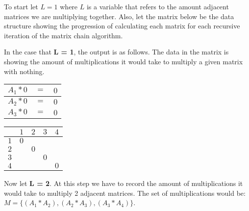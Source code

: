 \documentclass{article}
\begin{document}
To start let $L = 1$ where $L$ is a variable that refers to the amount adjacent matrices we are multiplying together. Also, let the matrix below be the data structure showing the progression of calculating each matrix for each recursive iteration of the matrix chain algorithm. 

In the case that \textbf{L = 1}, the output is as follows. The data in the matrix is showing the amount of multiplications it would take to multiply a given matrix with nothing. 

\begin{center}
	\begin{tabular}{| c c c |}
		
		\hline
		$A_{1} * 0$ &$=$ &$0$\\
		\hline
		$A_{2} * 0$ &$=$ &$0$ \\
		\hline
		$A_{3} * 0$ &$=$ &$0$ \\
		\hline
	
	\end{tabular}
\end{center}

\begin{center}
	\begin{tabular}{c | c | c | c | c}
	
		&$1$ &$2$ &$3$ &$4$ \\
		\hline
		$1$ &$0$ & & &\\
		\hline
		$2$ & &$0$ & &\\
		\hline
		$3$ & & &$0$ &\\
		\hline
		$4$ & & & &$0$\\
		
	\end{tabular}
\end{center}

Now let \textbf{L = 2}. At this step we have to record the amount of multiplications it would take to multiply 2 adjacent matrices. The set of multiplications would be: $M = \{(A_{1} * A_{2}), (A_{2} * A_{3}), (A_{3} * A_{4})\}$. 
\end{document}
